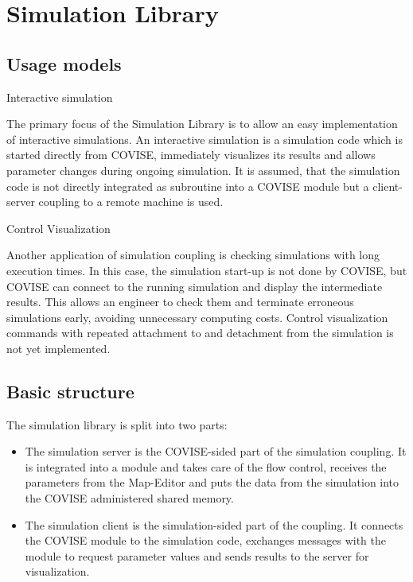 \begin{htmlonly}\begin{htmlonly}

\end{htmlonly}



\startdocument
\chapter{Simulation Library}
\label{SimulationLibrary}

\section{Usage models}

{\Large Interactive simulation}
\vspace*{0.5cm}

The primary focus of the Simulation Library is to allow an easy implementation of 
interactive simulations. An interactive simulation is a simulation code which is started 
directly from COVISE, immediately visualizes its results and allows parameter changes 
during ongoing simulation. It is assumed, that the simulation code is not directly 
integrated as subroutine into a COVISE module but a client-server coupling to a remote 
machine is used.

\vspace*{1cm}
{\Large Control Visualization}
\vspace*{0.5cm}

Another application of simulation coupling is checking simulations with long execution 
times. In this case, the simulation start-up is not done by COVISE, but COVISE can 
connect to the running simulation and display the intermediate results. This allows 
an engineer to check them and terminate erroneous simulations early, avoiding unnecessary 
computing costs. Control visualization commands with repeated attachment to and 
detachment from the simulation is not yet implemented.


\section{Basic structure}

The simulation library is split into two parts:
\begin{itemize}
\item The simulation server is the COVISE-sided part of the simulation coupling. It is 
integrated into a module and takes care of the flow control, receives the parameters 
from the Map-Editor and puts the data from the simulation into the COVISE administered 
shared memory.
\item The simulation client is the simulation-sided part of the coupling. It connects 
the COVISE module to the simulation code, exchanges messages with the module to request 
parameter values and sends results to the server for visualization. 
\end{itemize}



\end{htmlonly}
